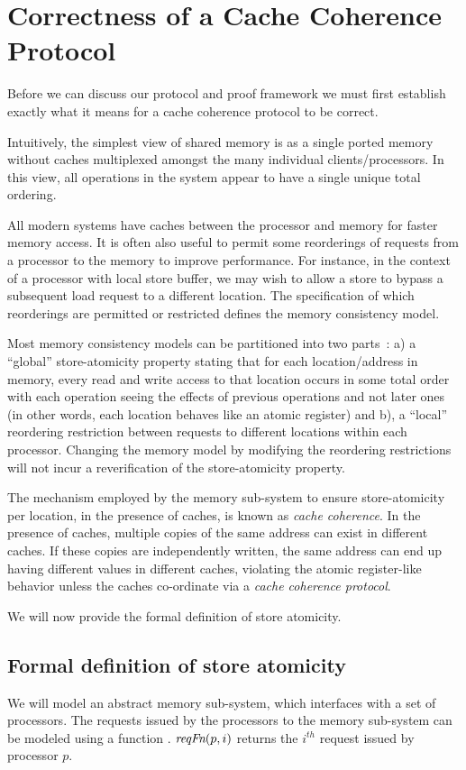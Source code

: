 \section{Correctness of a Cache Coherence Protocol}
\label{Background}

Before we can discuss our protocol and proof framework we must first establish
exactly what it means for a cache coherence protocol to be correct. 

Intuitively, the simplest view of shared memory is as a single ported memory
without caches multiplexed amongst the many individual clients/processors. In
this view, all operations in the system appear to have a single unique total
ordering.

All modern systems have caches between the processor and memory for faster
memory access.  It is often also useful to permit some reorderings of requests
from a processor to the memory to improve performance.  For instance, in the
context of a processor with local store buffer, we may wish to allow a store to
bypass a subsequent load request to a different location. The specification of
which reorderings are permitted or restricted defines the memory consistency
model.

Most memory consistency models can be partitioned into two
parts~\cite{Arvind-memory-model}: a) a ``global'' store-atomicity property
stating that for each location/address in memory, every read and write access
to that location occurs in some total order with each operation seeing the
effects of previous operations and not later ones (in other words, each
location behaves like an atomic register) and b), a ``local'' reordering
restriction between requests to different locations within each processor.
Changing the memory model by modifying the reordering restrictions will not
incur a reverification of the store-atomicity property.

The mechanism employed by the memory sub-system to ensure store-atomicity per
location, in the presence of caches, is known as \emph{cache coherence}. In the
presence of caches, multiple copies of the same address can exist in different
caches. If these copies are independently written, the same address can end up
having different values in different caches, violating the atomic register-like
behavior unless the caches co-ordinate via a \emph{cache coherence protocol}.

We will now provide the formal definition of store atomicity.

\subsection{Formal definition of store atomicity}
We will model an abstract memory sub-system, which interfaces with a set of
processors. The requests issued by the processors to the memory sub-system can
be modeled using a function \reqFn. $\textit{reqFn}(p, i)$ returns the $i^{th}$ request
issued by processor $p$.

